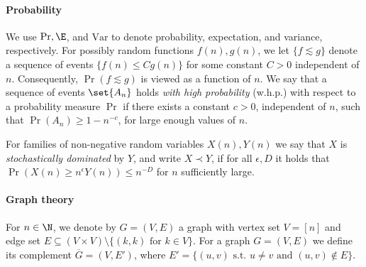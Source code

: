 \paragraph*{Probability}
We use \(\Pr, \E\), and \(\text{Var}\) to denote probability, expectation, and variance, respectively.  
For possibly random functions \(f(n), g(n)\), we let \(\{f \lesssim g\}\) denote a sequence of events \(\{f(n) \leq C g(n)\}\) for some constant \(C > 0\) independent of \(n\). 
Consequently, \(\Pr(f \lesssim g)\) is viewed as a function of \(n\).
We say that a sequence of events $\set{A_n}$ holds \emph{with high probability} (w.h.p.) with respect to a probability measure $\Pr$ if there exists a constant $c > 0$, independent of $n$, such that $\Pr(A_n) \geq 1-n^{-c}$, for large enough values of $n$.

For families of non-negative random variables $X(n),Y(n)$ we say that $X$ is \emph{stochastically dominated} by $Y$, and write $X\prec Y$, if for all $\epsilon,D$ it holds that $\Pr(X(n)\ge n^{\epsilon} Y(n))\le n^{-D}$ for $n$ sufficiently large. 
\paragraph*{Graph theory}
For \(n \in \N\), we denote by \(G = (V, E)\) a graph with vertex set \(V = [n]\) 
and edge set \(E \subseteq (V \times V) \setminus \{(k, k) \text{ for } k \in V\}\).
For a graph \(G = (V, E)\) we define its complement \(\overline{G} = (V, E')\),
where \(E' = \{(u, v) \text{ s.t. } u \neq v \text{ and } (u, v) \notin E\}\).